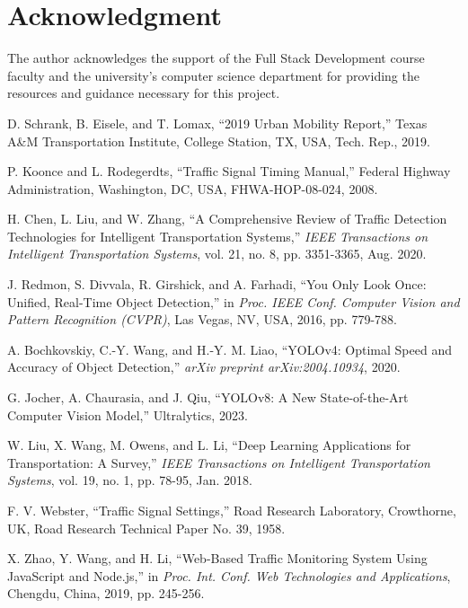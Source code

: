 \documentclass[conference]{IEEEtran}
\begin{document}
\section*{Acknowledgment}

The author acknowledges the support of the Full Stack Development course faculty and the university's computer science department for providing the resources and guidance necessary for this project.

\begin{thebibliography}{20}

D. Schrank, B. Eisele, and T. Lomax, ``2019 Urban Mobility Report,'' Texas A\&M Transportation Institute, College Station, TX, USA, Tech. Rep., 2019.

P. Koonce and L. Rodegerdts, ``Traffic Signal Timing Manual,'' Federal Highway Administration, Washington, DC, USA, FHWA-HOP-08-024, 2008.

H. Chen, L. Liu, and W. Zhang, ``A Comprehensive Review of Traffic Detection Technologies for Intelligent Transportation Systems,'' \textit{IEEE Transactions on Intelligent Transportation Systems}, vol. 21, no. 8, pp. 3351-3365, Aug. 2020.

J. Redmon, S. Divvala, R. Girshick, and A. Farhadi, ``You Only Look Once: Unified, Real-Time Object Detection,'' in \textit{Proc. IEEE Conf. Computer Vision and Pattern Recognition (CVPR)}, Las Vegas, NV, USA, 2016, pp. 779-788.

A. Bochkovskiy, C.-Y. Wang, and H.-Y. M. Liao, ``YOLOv4: Optimal Speed and Accuracy of Object Detection,'' \textit{arXiv preprint arXiv:2004.10934}, 2020.

G. Jocher, A. Chaurasia, and J. Qiu, ``YOLOv8: A New State-of-the-Art Computer Vision Model,'' Ultralytics, 2023.

W. Liu, X. Wang, M. Owens, and L. Li, ``Deep Learning Applications for Transportation: A Survey,'' \textit{IEEE Transactions on Intelligent Transportation Systems}, vol. 19, no. 1, pp. 78-95, Jan. 2018.

F. V. Webster, ``Traffic Signal Settings,'' Road Research Laboratory, Crowthorne, UK, Road Research Technical Paper No. 39, 1958.

X. Zhao, Y. Wang, and H. Li, ``Web-Based Traffic Monitoring System Using JavaScript and Node.js,'' in \textit{Proc. Int. Conf. Web Technologies and Applications}, Chengdu, China, 2019, pp. 245-256.


\end{thebibliography}
\end{document}
